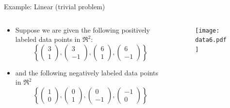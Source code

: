 \begin{frame}{Example: Linear (trivial problem)}
\begin{columns}
\begin{column}{7cm}
\begin{itemize}
\item Suppose we are given the following positively labeled data points in $\Re^2$:
\[\left\{ {\left( {\begin{array}{*{20}{c}}
  3 \\ 
  1 
\end{array}} \right),\left( {\begin{array}{*{20}{c}}
  3 \\ 
  { - 1} 
\end{array}} \right),\left( {\begin{array}{*{20}{c}}
  6 \\ 
  1 
\end{array}} \right),\left( {\begin{array}{*{20}{c}}
  6 \\ 
  { - 1} 
\end{array}} \right)} \right\}\]
\item and the following negatively labeled data points in $\Re^2$
\[\left\{ {\left( {\begin{array}{*{20}{c}}
  1 \\ 
  0 
\end{array}} \right),\left( {\begin{array}{*{20}{c}}
  0 \\ 
  { 1} 
\end{array}} \right),\left( {\begin{array}{*{20}{c}}
  0 \\ 
  -1 
\end{array}} \right),\left( {\begin{array}{*{20}{c}}
  -1 \\ 
  { 0} 
\end{array}} \right)} \right\}\]
\end{itemize}
\end{column}
\begin{column}{7cm}
\begin{figure}
\texttt{[image: data6.pdf]}
\end{figure}
\end{column}
\end{columns}
\end{frame}

